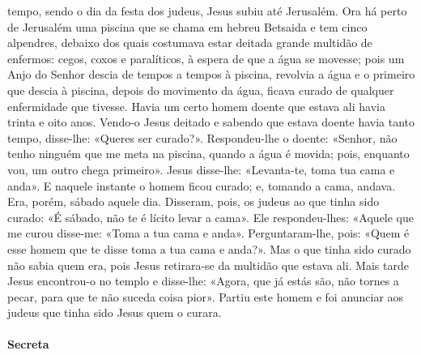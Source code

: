 \begin{paracol}{2}
{ tempo, sendo o dia da festa dos judeus, Jesus subiu até Jerusalém. Ora há perto de Jerusalém uma piscina que se chama em hebreu Betsaida e tem cinco alpendres, debaixo dos quais costumava estar deitada grande multidão de enfermos: cegos, coxos e paralíticos, à espera de que a água se movesse; pois um Anjo do Senhor descia de tempos a tempos à piscina, revolvia a água e o primeiro que descia à piscina, depois do movimento da água, ficava curado de qualquer enfermidade que tivesse. Havia um certo homem doente que estava ali havia trinta e oito anos. Vendo-o Jesus deitado e sabendo que estava doente havia tanto tempo, disse-lhe: «Queres ser curado?». Respondeu-lhe o doente: «Senhor, não tenho ninguém que me meta na piscina, quando a água é movida; pois, enquanto vou, um outro chega primeiro». Jesus disse-lhe: «Levanta-te, toma tua cama e anda». E naquele instante o homem ficou curado; e, tomando a cama, andava. Era, porém, sábado aquele dia. Disseram, pois, os judeus ao que tinha sido curado: «É sábado, não te é lícito levar a cama». Ele respondeu-lhes: «Aquele que me curou disse-me: «Toma a tua cama e anda». Perguntaram-lhe, pois: «Quem é esse homem que te disse toma a tua cama e anda?». Mas o que tinha sido curado não sabia quem era, pois Jesus retirara-se da multidão que estava ali. Mais tarde Jesus encontrou-o no templo e disse-lhe: «Agora, que já estás são, não tornes a pecar, para que te não suceda coisa pior». Partiu este homem e foi anunciar aos judeus que tinha sido Jesus quem o curara.
}\end{paracol}

\begin{paracol}{2}\switchcolumn{}\end{paracol}

\paragraph{Secreta}
\begin{paracol}{2}\switchcolumn{}\end{paracol}

